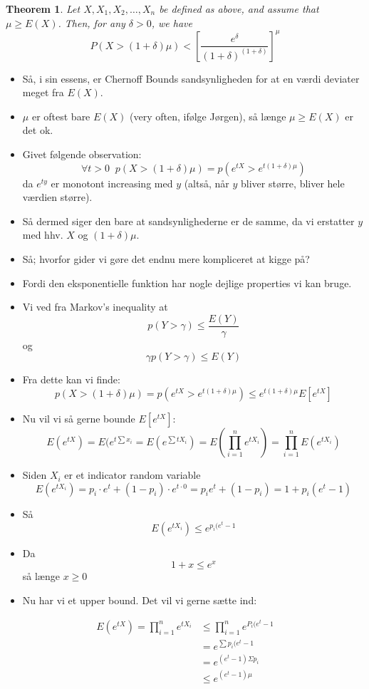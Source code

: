\documentclass[11pt]{article}
\newtheorem{theorem}{Theorem}
\theoremstyle{definition}
\theoremstyle{remark}
\begin{document}
  \begin{theorem}
  Let $X, X_{1}, X_{2}, \ldots, X_{n}$ be defined as above, and assume that $\mu \geq E(X)$. Then, for any $\delta > 0$, we have
  \[P(X > (1+\delta)\mu) < \left[ \frac{e^{\delta}}{(1+\delta)^{(1+\delta)}} \right]^{\mu}\]
\end{theorem}
\begin{itemize}
\item Så, i sin essens, er Chernoff Bounds sandsynligheden for at en værdi deviater meget fra $E(X)$.
\item $\mu$ er oftest bare $E(X)$ (very often, ifølge Jørgen), så længe $\mu \geq E(X)$ er det ok.
\item Givet følgende observation: \[ \forall t > 0 \; \; p(X > (1 + \delta) \mu) = p(e^{tX} > e^{t(1+\delta)\mu}) \] da $e^{ty}$ er monotont increasing med $y$ (altså, når $y$ bliver større, bliver hele værdien større).
\item Så dermed siger den bare at sandsynlighederne er de samme, da vi erstatter $y$ med hhv. $X$ og $(1 + \delta) \mu$.
\item Så; hvorfor gider vi gøre det endnu mere kompliceret at kigge på? 
\item Fordi den eksponentielle funktion har nogle dejlige properties vi kan bruge.
\item Vi ved fra Markov's inequality at \[ p(Y > \gamma) \leq \frac{E(Y)}{\gamma} \] og \[ \gamma p(Y > \gamma) \leq E(Y) \]
\item Fra dette kan vi finde: \[ p(X > (1+ \delta) \mu) = p(e ^{tX} > e^{t(1+ \delta) \mu}) \leq e^{t(1+ \delta) \mu} E[e^{tX}] \]
\item Nu vil vi så gerne bounde $E[e^{tX}]$: \[ E(e^{tX}) = E(e^{t \sum x_{i}} = E(e^{\sum t X_{i}}) = E( \prod_{i=1}^{n}e^{tX_{i}}) = \prod_{i=1}^{n} E(e^{tX_{i}}) \]
\item Siden $X_{i}$ er et indicator random variable \[ E(e^{tX_{i}}) = p_{i} \cdot e^{t}+ (1-p_{i}) \cdot e^{t\cdot 0} = p_{i}e^{t} + (1-p_{i}) = 1 + p_{i}(e^{t}-1) \]
\item Så \[ E(e^{tX_{i}}) \leq e^{p_{i} (e^{t}-1} \]
\item Da \[ 1 + x \leq e^{x} \] så længe $x \geq 0$
\item Nu har vi et upper bound. Det vil vi gerne sætte ind:  
\end{itemize}

\begin{equation}
\begin{split}
  E(e^{tX}) = \prod_{i=1}^{n}e^{tX_{i}} &\leq \prod_{i=1}^{n} e^{P_{i}(e^{t}-1} \\
                                    &= e^{\sum p_{i} (e^{t}-1}\\
                                    &= e^{(e^{t}-1) \Sigma p_{i}}\\
  &\leq e^{(e^{t}-1)\mu}
\end{split}

\end{equation}
\end{document}
